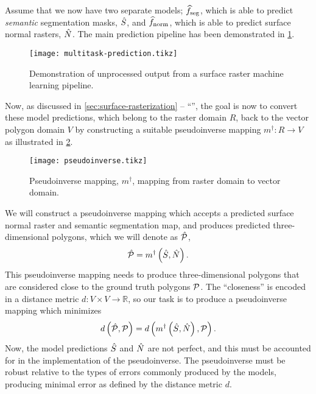 Assume that we now have two separate models; $\widehat{f}_{\mathrm{seg}}$, which is able to predict \emph{semantic} segmentation masks, $\hat{S}$, and $\widehat{f}_{\mathrm{norm}}$, which is able to predict surface normal rasters, $\hat{N}$.
The main prediction pipeline has been demonstrated in \cref{fig:multitask-prediction}.
\begin{figure}[H]
  \centering
  \texttt{[image: multitask-prediction.tikz]}
  \caption{%
    Demonstration of unprocessed output from a surface raster machine learning pipeline.
  }%
  \label{fig:multitask-prediction}
\end{figure}
\noindent
Now, as discussed in \cref{sec:surface-rasterization} -- \enquote{}, the goal is now to convert these model predictions, which belong to the raster domain $R$, back to the vector polygon domain $V$ by constructing a suitable pseudoinverse mapping $m^{\dagger}: R \rightarrow V$ as illustrated in \cref{fig:pseudoinverse}.
\begin{figure}[H]
  \centering
  \texttt{[image: pseudoinverse.tikz]}
  \caption{Pseudoinverse mapping, $m^{\dagger}$, mapping from raster domain to vector domain.}%
  \label{fig:pseudoinverse}
\end{figure}
\noindent
We will construct a pseudoinverse mapping which accepts a predicted surface normal raster and semantic segmentation map, and produces predicted three-dimensional polygons, which we will denote as $\hat{\mathcal{P}}$,
\begin{equation*}
  \hat{\mathcal{P}}
  =
  m^{\dagger}\left(
    \hat{S},
    \hat{N}
  \right).
\end{equation*}
This pseudoinverse mapping needs to produce three-dimensional polygons that are considered close to the ground truth polygons $\mathcal{P}$.
The \enquote{closeness} is encoded in a distance metric $d: V \times V \rightarrow \mathbb{R}$, so our task is to produce a pseudoinverse mapping which minimizes
\begin{equation*}
  d\left(
    \hat{\mathcal{P}},
    \mathcal{P}
  \right)
  =
  d\left(
    m^{\dagger}\left(\hat{S}, \hat{N}\right),
    \mathcal{P}
  \right).
\end{equation*}
Now, the model predictions $\hat{S}$ and $\hat{N}$ are not perfect, and this must be accounted for in the implementation of the pseudoinverse.
The pseudoinverse must be robust relative to the types of errors commonly produced by the models, producing minimal error as defined by the distance metric $d$.
